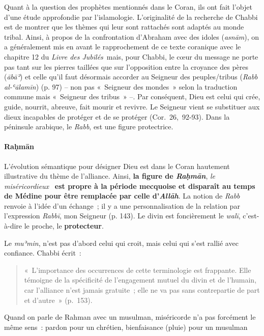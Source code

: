 Quant à la question des prophètes mentionnés dans le Coran, ils ont fait
l'objet d'une étude approfondie par l'islamologie. L'originalité de la recherche de Chabbi est de
montrer que les thèmes qui leur sont rattachés sont adaptés au monde
tribal. Ainsi, à propos de la confrontation d'Abraham avec des idoles
(\emph{asnām}), on a généralement mis en avant le rapprochement de ce
texte coranique avec le chapitre 12 du \emph{Livre des
Jubilés}~mais, pour
Chabbi, le cœur du message ne porte pas tant sur les pierres taillées
que sur l'opposition entre la croyance des pères (\emph{ābāʾ}) et celle
qu'il faut désormais accorder au Seigneur des peuples/tribus (\emph{Rabb
al-ʿālamīn}) (p. 97) -- non pas «~Seigneur des mondes~» selon la
traduction commune mais «~Seigneur des tribus~» --. Par conséquent, Dieu
est celui qui crée, guide, nourrit, abreuve, fait mourir et revivre. Le
Seigneur vient se substituer aux dieux incapables de protéger et de se
protéger (Cor.~26,~92-93). Dans la péninsule arabique, le \emph{Rabb},
est une figure protectrice.

 


\paragraph{Raḥmān}
L'évolution sémantique pour désigner Dieu est dans le Coran hautement
illustrative du thème de l'alliance. Ainsi, \textbf{la figure de
\emph{Raḥmān}}, \emph{le miséricordieux}~ \textbf{est propre à la
période mecquoise et disparaît au temps de Médine pour être remplacée
par celle d'\emph{Allāh}}. La notion de \emph{Rabb} renvoie à l'idée
d'un échange~; il y a une personnalisation de la relation par
l'expression \emph{Rabbī}, mon Seigneur (p. 143). Le divin est
foncièrement le \emph{walī}, c'est-à-dire le proche, le
\textbf{{protecteur}}.

Le \emph{muʾmin}, n'est pas
d'abord celui qui croit, mais celui qui s'est rallié avec confiance.
Chabbi écrit~:
\begin{quote}
    
«~L'importance des occurrences de cette terminologie est frappante. Elle
témoigne de la spécificité de l'engagement mutuel du divin et de
l'humain, car l'alliance n'est jamais gratuite~; elle ne va pas sans
contrepartie de part et d'autre~» (p.~153).
\end{quote}
\begin{Ex}

{Quand on parle de Rahman avec un musulman, miséricorde
n'a pas forcément le même sens~: pardon pour un chrétien, bienfaisance
(pluie) pour un
musulman}
\end{Ex}

